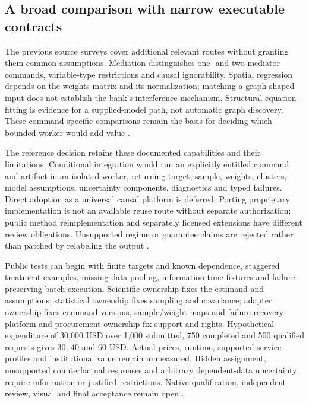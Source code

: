\subsection{A broad comparison with narrow executable contracts}
The previous source surveys cover additional relevant routes without
granting them common assumptions. Mediation distinguishes one- and
two-mediator commands, variable-type restrictions and causal ignorability.
Spatial regression depends on the weights matrix and its normalization;
matching a graph-shaped input does not establish the bank's interference
mechanism. Structural-equation fitting is evidence for a supplied-model
path, not automatic graph discovery. These command-specific comparisons
remain the basis for deciding which bounded worker would add value
\cite{exec13_ci_stata_mediate,exec20_med_stata_multiple,
exec20_network_stata_spregress,exec13_stata_sem,exec24_stata_choice}.

The reference decision retains these documented capabilities and their
limitations. Conditional integration would run an explicitly entitled
command and artifact in an isolated worker, returning target, sample,
weights, clusters, model assumptions, uncertainty components, diagnostics
and typed failures. Direct adoption as a universal causal platform is
deferred. Porting proprietary implementation is not an available reuse route
without separate authorization; public method reimplementation and
separately licensed extensions have different review obligations.
Unsupported regime or guarantee claims are rejected rather than patched
by relabeling the output \cite{exec13_ivrd_license,exec24_stata_choice}.

Public tests can begin with finite targets and known dependence, staggered
treatment examples, missing-data pooling, information-time fixtures and
failure-preserving batch execution. Scientific ownership fixes the estimand
and assumptions; statistical ownership fixes sampling and covariance;
adapter ownership fixes command versions, sample/weight maps and failure
recovery; platform and procurement ownership fix support and rights.
Hypothetical expenditure of 30,000 USD over 1,000 submitted, 750 completed
and 500 qualified requests gives 30, 40 and 60 USD. Actual prices, runtime,
supported service profiles and institutional value remain unmeasured.
Hidden assignment, unsupported counterfactual responses and arbitrary
dependent-data uncertainty require information or justified restrictions.
Native qualification, independent review, visual and final acceptance
remain open \cite{exec24_stata_choice}.
